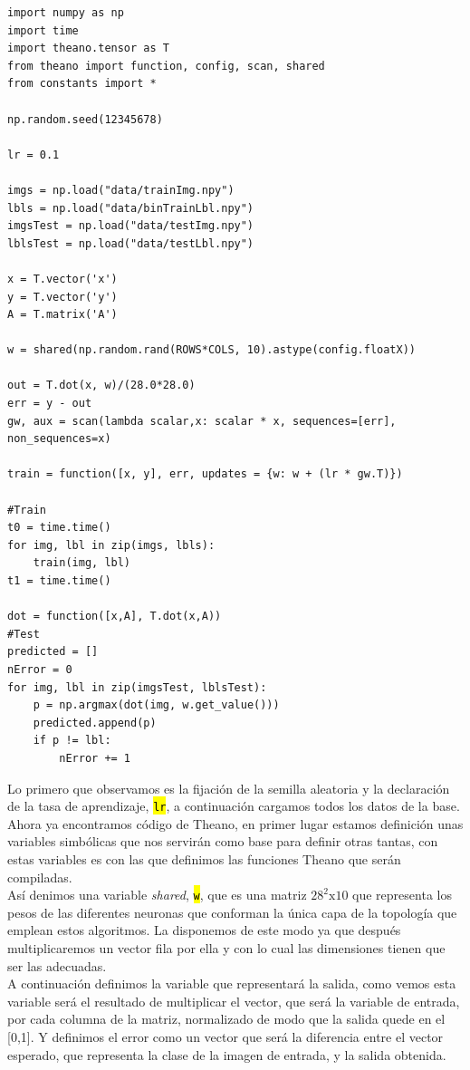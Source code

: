 \documentclass[10pt,a4paper]{article}
\newcommand{\code}[1]{\sethlcolor{light-gray}\hl{\texttt{#1}}} %
\begin{document}
\begin{lstlisting}
import numpy as np
import time
import theano.tensor as T
from theano import function, config, scan, shared
from constants import *

np.random.seed(12345678)

lr = 0.1

imgs = np.load("data/trainImg.npy")
lbls = np.load("data/binTrainLbl.npy")
imgsTest = np.load("data/testImg.npy")
lblsTest = np.load("data/testLbl.npy")

x = T.vector('x')
y = T.vector('y')
A = T.matrix('A')

w = shared(np.random.rand(ROWS*COLS, 10).astype(config.floatX))

out = T.dot(x, w)/(28.0*28.0)
err = y - out
gw, aux = scan(lambda scalar,x: scalar * x, sequences=[err], non_sequences=x)

train = function([x, y], err, updates = {w: w + (lr * gw.T)})

#Train
t0 = time.time()
for img, lbl in zip(imgs, lbls):
    train(img, lbl)
t1 = time.time()

dot = function([x,A], T.dot(x,A))
#Test
predicted = []
nError = 0
for img, lbl in zip(imgsTest, lblsTest):
    p = np.argmax(dot(img, w.get_value()))
    predicted.append(p)
    if p != lbl:
        nError += 1
\end{lstlisting}

Lo primero que observamos es la fijación de la semilla aleatoria y la declaración de la tasa de aprendizaje, \code{lr}, a continuación cargamos todos los datos de la base. Ahora ya encontramos código de Theano, en primer lugar estamos definición unas variables simbólicas que nos servirán como base para definir otras tantas, con estas variables es con las que definimos las funciones Theano que serán compiladas.\\

Así denimos una variable \textit{shared}, \code{w}, que es una matriz $28^2 \mathrm{x} 10$ que representa los pesos de las diferentes neuronas que conforman la única capa de la topología que emplean estos algoritmos. La disponemos de este modo ya que después multiplicaremos un vector fila por ella y con lo cual las dimensiones tienen que ser las adecuadas.\\

A continuación definimos la variable que representará la salida, como vemos esta variable será el resultado de multiplicar el vector, que será la variable de entrada, por cada columna de la matriz, normalizado de modo que la salida quede en el [0,1]. Y definimos el error como un vector que será la diferencia entre el vector esperado, que representa la clase de la imagen de entrada, y la salida obtenida.\\
\end{document}
